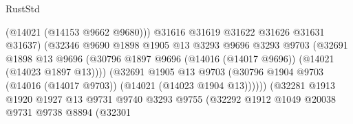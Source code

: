 \begin{lexlean}{RustStd}
\begin{coremodule}
                                            (@14021 (@14153 @9662 @9680)))
                                          @31616
                                          @31619
                                          @31622
                                          @31626
                                          @31631
                                          @31637)
                                        (@32346
                                          @9690
                                          @1898
                                          @1905
                                          @13
                                          @3293
                                          @9696
                                          @3293
                                          @9703
                                          (@32691
                                            @1898
                                            @13
                                            @9696
                                            (@30796
                                              @1897
                                              @9696
                                              (@14016 (@14017 @9696))
                                              (@14021 (@14023 @1897 @13))))
                                          (@32691
                                            @1905
                                            @13
                                            @9703
                                            (@30796
                                              @1904
                                              @9703
                                              (@14016 (@14017 @9703))
                                              (@14021 (@14023 @1904 @13))))))
                                      (@32281
                                        @1913
                                        @1920
                                        @1927
                                        @13
                                        @9731
                                        @9740
                                        @3293
                                        @9755
                                        (@32292
                                          @1912
                                          @1049
                                          @20038
                                          @9731
                                          @9738
                                          @8894
                                          (@32301

\end{coremodule}
\end{lexlean}
